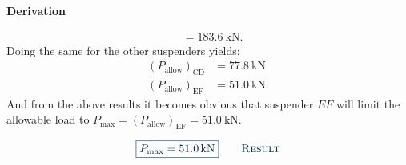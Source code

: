\documentclass[a4paper]{article}
\numberwithin{equation}{problem}
\newcommand{\AUheading}[1]{%
  \par\vspace{.4\baselineskip}%
  {\sffamily\bfseries\color{AUblueDark}#1\par}%
  \nobreak%
}
\newenvironment{derivation}[1][Derivation]{%
  \AUheading{#1}
  \begingroup\allowdisplaybreaks
  \setlength{\abovedisplayskip}{6pt}%
  \setlength{\belowdisplayskip}{6pt}%
  \setlength{\abovedisplayshortskip}{4pt}%
  \setlength{\belowdisplayshortskip}{4pt}%
}{\par\endgroup\medskip}
\newcommand{\finalresult}[1]{%
  \vspace{.2\baselineskip}%
  \begin{equation}
    {\color{AUblueDark}\boxed{\displaystyle #1}}
    \tag*{\textsc{\textcolor{AUblueDark}{Result}}}
  \end{equation}
  \newpage
}
\begin{document}
\begin{derivation}
\begin{align*}
    &= \qty{183,6}{\kN} 
  .\end{align*}
  Doing the same for the other suspenders yields:
  \begin{align*}
    \left( P_{\text{allow}} \right)_{\mathrm{CD}} &= \qty{77,8}{\kN} \\
    \left( P_{\text{allow}} \right)_{\mathrm{EF}} &= \qty{51,0}{\kN}
  .\end{align*}
  And from the above results it becomes obvious that suspender $EF$ will limit the allowable load to $P_{\mathrm{max}} = \left( P_{\text{allow}} \right)_{\mathrm{EF}} = \qty{51,0}{\kN}$.
\end{derivation}

\finalresult{P_{\mathrm{max}} = \qty{51,0}{\kN}}
\end{document}
